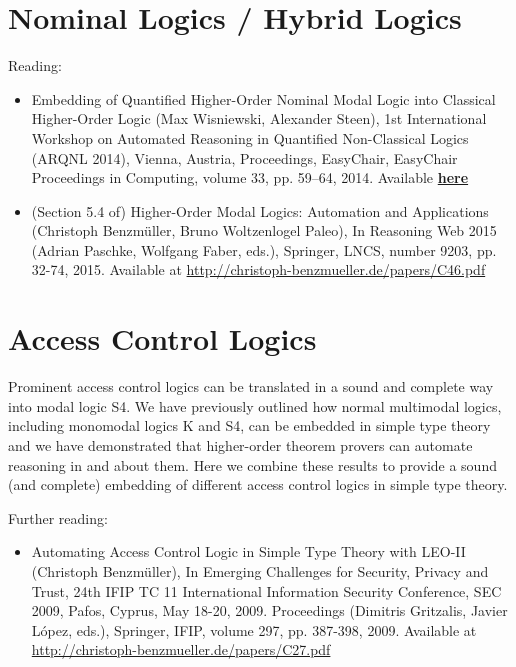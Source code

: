 \documentclass{article}
\begin{document}
\section{Nominal Logics / Hybrid Logics}
Reading:
\begin{itemize}
\item Embedding of Quantified Higher-Order Nominal Modal Logic into
  Classical Higher-Order Logic (Max Wisniewski, Alexander Steen), 1st
  International Workshop on Automated Reasoning in Quantified
  Non-Classical Logics (ARQNL 2014), Vienna, Austria, Proceedings,
  EasyChair, EasyChair Proceedings in Computing, volume 33,
  pp. 59--64, 2014. Available 
  \href{http://easychair.org/publications/download/Embedding_of_Quantified_Higher-Order_Nominal_Modal_Logic_into_Classical_Higher-Order_Logic}{\textbf{here}}
\item (Section 5.4 of) Higher-Order Modal Logics: Automation and Applications
  (Christoph Benzm\"uller, Bruno Woltzenlogel Paleo), In Reasoning Web
  2015 (Adrian Paschke, Wolfgang Faber, eds.), Springer, LNCS, number
  9203, pp. 32-74, 2015. Available at \href{http://christoph-benzmueller.de/papers/C46.pdf}{http://christoph-benzmueller.de/papers/C46.pdf}
\end{itemize}



\section{Access Control Logics}
Prominent access control logics can be translated in a sound and
complete way into modal logic S4. We have previously outlined how
normal multimodal logics, including monomodal logics K and S4, can be
embedded in simple type theory and we have demonstrated that
higher-order theorem provers can automate reasoning in and about
them. Here we combine these results to provide  a sound (and
complete) embedding of different access control logics in simple type
theory. 

Further reading:
\begin{itemize}
\item Automating Access Control Logic in Simple Type Theory with
  LEO-II (Christoph Benzm\"uller), In Emerging Challenges for Security,
  Privacy and Trust, 24th IFIP TC 11 International Information
  Security Conference, SEC 2009, Pafos, Cyprus, May 18-20,
  2009. Proceedings (Dimitris Gritzalis, Javier López, eds.),
  Springer, IFIP, volume 297, pp. 387-398, 2009. Available at \href{http://christoph-benzmueller.de/papers/C27.pdf}{http://christoph-benzmueller.de/papers/C27.pdf}
\end{itemize}
\end{document}
